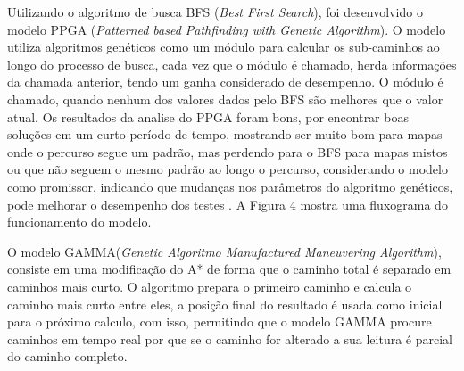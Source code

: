Utilizando o algoritmo de busca BFS (\textit{Best First Search}), foi desenvolvido o modelo PPGA (\textit{Patterned based Pathfinding with Genetic Algorithm}). O modelo utiliza algoritmos genéticos como um módulo para calcular os sub-caminhos ao longo do processo de busca, cada vez que o módulo é chamado, herda informações da chamada anterior, tendo um ganha considerado de desempenho. O módulo é chamado, quando nenhum dos valores dados pelo BFS são melhores que o valor atual. Os resultados da analise do PPGA foram bons, por encontrar boas soluções em um curto período de tempo, mostrando ser muito bom para mapas onde o percurso segue um padrão, mas perdendo para o BFS para mapas mistos ou que não seguem o mesmo padrão ao longo o percurso, considerando o modelo como promissor, indicando que mudanças nos parâmetros do algoritmo genéticos, pode melhorar o desempenho dos testes \cite{Ulysses}. A Figura 4 mostra uma fluxograma do funcionamento do modelo.

\begin{minipage}{\linewidth}
\end{minipage}

O modelo GAMMA(\textit{Genetic Algoritmo Manufactured Maneuvering Algorithm}), consiste em uma modificação do A* de forma que o caminho total é separado em caminhos mais curto. O algoritmo prepara o primeiro caminho e calcula o caminho mais curto entre eles, a posição final do resultado é usada como inicial para o próximo calculo, com isso, permitindo que o modelo GAMMA procure caminhos em tempo real por que se o caminho for alterado a sua leitura é parcial do caminho completo.\cite{Ryan}



